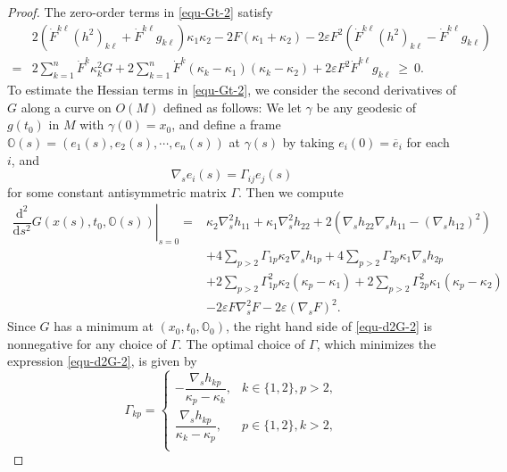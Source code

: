 \documentclass[10pt,a4paper]{amsart}
\begin{document}
\begin{proof}
    The zero-order terms in \eqref{equ-Gt-2} satisfy
    \begin{align}
    	& 2 \left( \dot{F}^{k\ell}(h^2)_{k\ell} + \dot{F}^{k\ell}g_{k\ell} \right)\kappa_1\kappa_2 - 2 F (\kappa_1+\kappa_2) - 2 \varepsilon F^2 \left( \dot{F}^{k\ell}(h^2)_{k\ell} - \dot{F}^{k\ell}g_{k\ell} \right) \nonumber\\
    	=& 2 \sum\limits_{k=1}^n \dot{F}^k \kappa_k^2 G + 2 \sum\limits_{k=1}^n \dot{F}^k (\kappa_k-\kappa_1)(\kappa_k-\kappa_2) + 2 \varepsilon F^2 \dot{F}^{k\ell}g_{k\ell} ~
    	\geq ~ 0.   \label{equ-zero-2}
    \end{align}
    To estimate the Hessian terms in \eqref{equ-Gt-2}, we consider the second derivatives of $G$ along a curve on $O(M)$ defined as follows: We let $\gamma$ be any geodesic of $g(t_0)$ in $M$ with $\gamma(0)=x_0$, and define a frame $\mathbb{O}(s)=(e_1(s),e_2(s),\cdots,e_n(s))$ at $\gamma(s)$ by taking $e_i(0)=\overline{e}_i$ for each $i$, and
    \begin{equation*}
    	\nabla_s e_i(s) = \Gamma_{ij}e_j(s)
    \end{equation*}
    for some constant antisymmetric matrix $\Gamma$. Then we compute
    \begin{align}
    	\left.\dfrac{\mathrm{d}^2}{\mathrm{d}s^2}G(x(s),t_0,\mathbb{O}(s))\right|_{s=0} = & \kappa_2 \nabla_s^2 h_{11} + \kappa_1 \nabla_s^2 h_{22} + 2 \left( \nabla_s h_{22}\nabla_s h_{11} - (\nabla_s h_{12})^2 \right) \nonumber\\
    	& + 4 \sum\limits_{p>2} \Gamma_{1p}\kappa_2 \nabla_s h_{1p} + 4 \sum\limits_{p>2} \Gamma_{2p}\kappa_1 \nabla_s h_{2p} \nonumber\\
    	&+ 2 \sum\limits_{p>2} \Gamma_{1p}^2 \kappa_2(\kappa_p-\kappa_1) + 2 \sum\limits_{p>2} \Gamma_{2p}^2 \kappa_1 (\kappa_p-\kappa_2) \nonumber\\
    	& - 2 \varepsilon F \nabla_s^2 F - 2 \varepsilon (\nabla_s F)^2.  
    	\label{equ-d2G-2}
    \end{align}
    Since $G$ has a minimum at $(x_0,t_0,\mathbb{O}_0)$, the right hand side of \eqref{equ-d2G-2} is nonnegative for any choice of $\Gamma$. The optimal choice of $\Gamma$, which minimizes the expression \eqref{equ-d2G-2}, is given by
    \begin{equation*}
    	\Gamma_{kp}=\begin{cases}
    		-\dfrac{\nabla_s h_{kp}}{\kappa_p-\kappa_k},&k\in\{1,2\},p>2,\\
    		\dfrac{\nabla_s h_{kp}}{\kappa_k-\kappa_p},&p\in\{1,2\},k>2,\\

\end{cases}
\end{equation*}
\end{proof}
\end{document}
